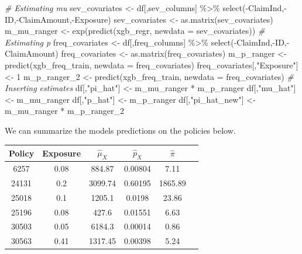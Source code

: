 \documentclass[
]{article}
\newenvironment{Shaded}{\begin{snugshade}}{\end{snugshade}}
\newcommand{\AttributeTok}[1]{\textcolor[rgb]{0.77,0.63,0.00}{#1}}
\newcommand{\CommentTok}[1]{\textcolor[rgb]{0.56,0.35,0.01}{\textit{#1}}}
\newcommand{\DecValTok}[1]{\textcolor[rgb]{0.00,0.00,0.81}{#1}}
\newcommand{\FunctionTok}[1]{\textcolor[rgb]{0.00,0.00,0.00}{#1}}
\newcommand{\NormalTok}[1]{#1}
\newcommand{\OtherTok}[1]{\textcolor[rgb]{0.56,0.35,0.01}{#1}}
\newcommand{\SpecialCharTok}[1]{\textcolor[rgb]{0.00,0.00,0.00}{#1}}
\newcommand{\StringTok}[1]{\textcolor[rgb]{0.31,0.60,0.02}{#1}}
\begin{document}
\begin{Shaded}
\begin{Highlighting}[]
\CommentTok{\# Estimating mu}
\NormalTok{sev\_covariates }\OtherTok{\textless{}{-}}\NormalTok{ df[,sev\_columns] }\SpecialCharTok{\%\textgreater{}\%}
  \FunctionTok{select}\NormalTok{(}\SpecialCharTok{{-}}\NormalTok{ClaimInd,}\SpecialCharTok{{-}}\NormalTok{ID,}\SpecialCharTok{{-}}\NormalTok{ClaimAmount,}\SpecialCharTok{{-}}\NormalTok{Exposure)}
\NormalTok{sev\_covariates }\OtherTok{\textless{}{-}}  \FunctionTok{as.matrix}\NormalTok{(sev\_covariates)}
\NormalTok{m\_mu\_ranger }\OtherTok{\textless{}{-}} \FunctionTok{exp}\NormalTok{(}\FunctionTok{predict}\NormalTok{(xgb\_regr, }\AttributeTok{newdata =}\NormalTok{ sev\_covariates))}
\CommentTok{\# Estimating p}
\NormalTok{freq\_covariates }\OtherTok{\textless{}{-}}\NormalTok{ df[,freq\_columns] }\SpecialCharTok{\%\textgreater{}\%}
  \FunctionTok{select}\NormalTok{(}\SpecialCharTok{{-}}\NormalTok{ClaimInd,}\SpecialCharTok{{-}}\NormalTok{ID,}\SpecialCharTok{{-}}\NormalTok{ClaimAmount)}
\NormalTok{freq\_covariates }\OtherTok{\textless{}{-}} \FunctionTok{as.matrix}\NormalTok{(freq\_covariates)}
\NormalTok{m\_p\_ranger }\OtherTok{\textless{}{-}} \FunctionTok{predict}\NormalTok{(xgb\_freq\_train, }\AttributeTok{newdata =}\NormalTok{ freq\_covariates)}
\NormalTok{freq\_covariates[,}\StringTok{"Exposure"}\NormalTok{] }\OtherTok{\textless{}{-}} \DecValTok{1}
\NormalTok{m\_p\_ranger\_2 }\OtherTok{\textless{}{-}} \FunctionTok{predict}\NormalTok{(xgb\_freq\_train, }\AttributeTok{newdata =}\NormalTok{ freq\_covariates)}
\CommentTok{\# Inserting estimates}
\NormalTok{df[,}\StringTok{"pi\_hat"}\NormalTok{] }\OtherTok{\textless{}{-}}\NormalTok{ m\_mu\_ranger }\SpecialCharTok{*}\NormalTok{ m\_p\_ranger}
\NormalTok{df[,}\StringTok{"mu\_hat"}\NormalTok{] }\OtherTok{\textless{}{-}}\NormalTok{ m\_mu\_ranger}
\NormalTok{df[,}\StringTok{"p\_hat"}\NormalTok{] }\OtherTok{\textless{}{-}}\NormalTok{ m\_p\_ranger}
\NormalTok{df[,}\StringTok{"pi\_hat\_new"}\NormalTok{] }\OtherTok{\textless{}{-}}\NormalTok{ m\_mu\_ranger }\SpecialCharTok{*}\NormalTok{ m\_p\_ranger\_2}
\end{Highlighting}
\end{Shaded}

We can summarize the models predictions on the policies below.

\begin{longtable}[]{@{}cccccc@{}}
\toprule()
Policy & Exposure & \(\hat \mu_X\) & \(\hat p_X\) & \(\hat \pi\) & \\
\midrule()
\endhead
6257 & 0.08 & 884.87 & 0.00804 & 7.11 & \\
24131 & 0.2 & 3099.74 & 0.60195 & 1865.89 & \\
25018 & 0.1 & 1205.1 & 0.0198 & 23.86 & \\
25196 & 0.08 & 427.6 & 0.01551 & 6.63 & \\
30503 & 0.05 & 6184.3 & 0.00014 & 0.86 & \\
30563 & 0.41 & 1317.45 & 0.00398 & 5.24 & \\
\bottomrule()
\end{longtable}
\end{document}
